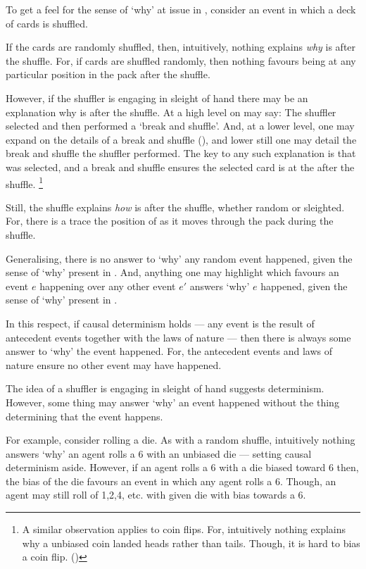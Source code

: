 \begin{note}
  To get a feel for the sense of `why' at issue in \qWhy{}, consider an event in which a deck of cards is shuffled.

  If the cards are randomly shuffled, then, intuitively, nothing explains \emph{why} \mainCard{} is \mainCardPos{} after the shuffle.
  For, if cards are shuffled randomly, then nothing favours \mainCard{} being at any particular position in the pack after the shuffle.

  However, if the shuffler is engaging in sleight of hand there may be an explanation why \mainCard{} is \mainCardPos{} after the shuffle.
  At a high level on may say: The shuffler selected \mainCard{} and then performed a `break and shuffle'.
  And, at a lower level, one may expand on the details of a break and shuffle (\cite[cf.][189--190]{Hilliard:1994aa}), and lower still one may detail the break and shuffle the shuffler performed.
  The key to any such explanation is that \mainCard{} was selected, and a break and shuffle ensures the selected card is at the \mainCardPos{} after the shuffle.%
  \footnote{
    A similar observation applies to coin flips.
    For, intuitively nothing explains why a unbiased coin landed heads rather than tails.
    Though, it is hard to bias a coin flip. (\cite{Gelman:2002ww})
  }
\end{note}

\begin{note}
  Still, the shuffle explains \emph{how} \mainCard{} is \mainCardPos{} after the shuffle, whether random or sleighted.
  For, there is a trace the position of \mainCard{} as it moves through the pack during the shuffle.
\end{note}


\begin{note}
  \nocite{Hoefer:2023aa}
  Generalising, there is no answer to `why' any random event happened, given the sense of `why' present in \qWhy{}.
  And, anything one may highlight which favours an event \(e\) happening over any other event \(e'\) answers `why' \(e\) happened, given the sense of `why' present in \qWhy{}.

  In this respect, if causal determinism holds --- any event is the result of antecedent events together with the laws of nature --- then there is always some answer to `why' the event happened.
  For, the antecedent events and laws of nature ensure no other event may have happened.
\end{note}


\begin{note}
  The idea of a shuffler is engaging in sleight of hand suggests determinism.
  However, some thing may answer `why' an event happened without the thing determining that the event happens.

  For example, consider rolling a die.
  As with a random shuffle, intuitively nothing answers `why' an agent rolls a 6 with an unbiased die  --- setting causal determinism aside.
  However, if an agent rolls a 6 with a die biased toward 6 then, the bias of the die favours an event in which any agent rolls a 6.
  Though, an agent may still roll of 1,2,4, etc. with given die with bias towards a 6.
\end{note}


